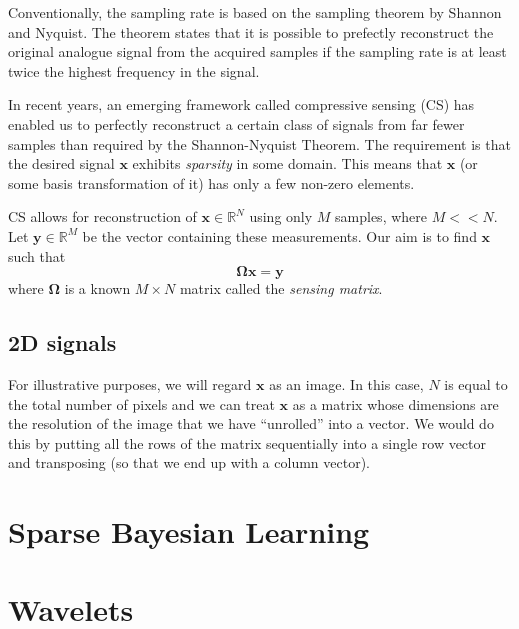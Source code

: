 \documentclass[final,3p,times,twocolumn]{report}
\let\bs\boldsymbol
\begin{document}
Conventionally, the sampling rate is based on the sampling theorem by Shannon and Nyquist.
The theorem states that it is possible to prefectly reconstruct the original analogue signal from the acquired samples if the sampling rate is at least twice the highest frequency in the signal.

In recent years, an emerging framework called compressive sensing (CS) has enabled us to perfectly reconstruct a certain class of signals from far fewer samples than required by the Shannon-Nyquist Theorem. 
The requirement is that the desired signal $\bs x$ exhibits \emph{sparsity} in some domain.
This means that $\bs x$ (or some basis transformation of it) has only a few non-zero elements.

CS allows for reconstruction of $\bs x \in \mathbb{R}^N$ using only $M$ samples, where $M << N$.
Let $\bs y \in \mathbb{R}^M$ be the vector containing these measurements.
Our aim is to find $\bs x$ such that
\begin{equation*}
\bs\Omega\bs x = \bs y
\end{equation*}
where $\bs\Omega$ is a known $M\times N$ matrix called the \emph{sensing matrix}.


\section{2D signals}
For illustrative purposes, we will regard $\bs x$ as an image.
In this case, $N$ is equal to the total number of pixels and we can treat $\bs x$ as a matrix whose dimensions are the resolution of the image that we have ``unrolled'' into a vector.
We would do this by putting all the rows of the matrix sequentially into a single row vector and transposing (so that we end up with a column vector).




\chapter{Sparse Bayesian Learning}
\label{chap:RVM}
\cite{tipping2001}
\chapter{Wavelets}
\end{document}
